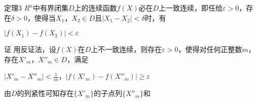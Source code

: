 \documentclass{ctexart}
\begin{document}
\begin{flushleft}
{\heiti 定理3}{ }{ }{ }{$R^n$}{\kaishu 中有界闭集{$D$}上的连续函数{$f(X)$}必在{$D$}上一致连续，即任给{$\varepsilon>0$}，存在{$\delta >0$}，使得当{$X_1$}，{$X_2\in D$}且{$\mid X_1-X_2\mid <\delta$}时，有}\par
\end{flushleft}
\begin{center}
{$\mid f(X_1)-f(X_2)\mid <\varepsilon$}\par
\end{center}


{\heiti 证}{ }{ }{ }{用反证法，设{$f(X)$}在{$D$}上不一致连续，则存在{$\varepsilon>0$}，使得对任何正整数{$m$}，存在{$X'_m$}，{$X''_m\in D$}，满足}\par
\begin{center}
{$\mid X'_m-X''_m\mid <{\frac{1}{m}}$，{$\mid f(X'_m)-f(X''_m)\mid \geqslant\varepsilon $}}\par
\end{center}
{由{$D$}的列紧性可知存在{$\{X'_m\}$}的子点列{$\{X''_m\}$}和}
\end{document}
